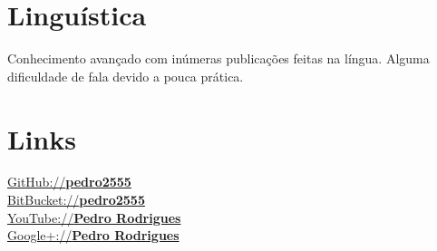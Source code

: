 \documentclass[letterpaper]{deedy-resume} %
\begin{document}
\begin{minipage}[t]{0.33\textwidth}
\sectionspace

\section{Linguística}
Conhecimento avançado com inúmeras publicações feitas na língua. Alguma dificuldade de fala devido a pouca prática.

\section{Links}
\href{https://github.com/pedro2555}{GitHub://\textbf{pedro2555}}\\
\href{https://bitbucket.org/pedro2555}{BitBucket://\textbf{pedro2555}}\\
\href{https://www.youtube.com/channel/UCxvDHtW_fPVIPHXOBzxt6Fg}{YouTube://\textbf{Pedro Rodrigues}}\\
\href{https://plus.google.com/105867523802923906663/posts}{Google+://\textbf{Pedro Rodrigues}}\\

\end{minipage}
\hfill
%
%
\end{document}
